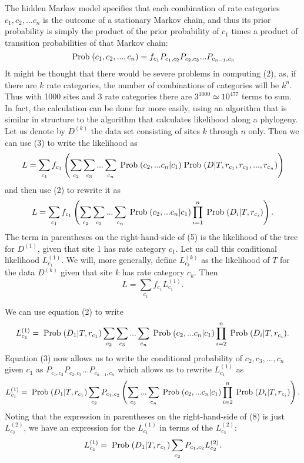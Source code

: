 \documentclass[12pt]{article}
\begin{document}
The hidden Markov model specifies that each combination of rate categories
$c_1, c_2, ... c_n$ is the outcome of a stationary Markov chain, and thus its
prior probability is simply the product of the prior probability of $c_1$
times a product of transition probabilities of that Markov chain:
\begin{equation} %
\prob (c_1, c_2, ..., c_n) = f_{c_1} P_{c_1, c_2} P_{c_2, c_3} ... P_{c_{n-1},c_n}
\end{equation}
It might be thought that there would be severe problems in computing (2), as,
if there are $k$ rate categories, the number of combinations of categories will
be $k^n$.  Thus with 1000 sites and 3 rate categories there are $3^{1000} \simeq
10^{477}$ terms to sum.  In fact, the calculation can be done far more easily,
using an algorithm that is similar in structure to the algorithm that
calculates likelihood along a phylogeny.
Let us denote by $D^{(k)}$ the data set consisting of sites $k$ through $n$ only.
Then we can use (3) to write the likelihood as 
\begin{equation} %
L = \sum_{c_1}f_{c_1}\left(\sum_{c_2} \sum_{c_3} ... \sum_{c_n} \prob(c_2, ... c_n|c_1) \prob(D|T, r_{c_1}, r_{c_2}, ..., r_{c_n})\right)
\end{equation}
and then use (2) to rewrite it as 
\begin{equation} %
L = \sum_{c_1}f_{c_1}\left(\sum_{c_2} \sum_{c_3} ... \sum_{c_n} \prob(c_2, ... c_n|c_1) \prod_{i=1}^n\prob(D_i|T, r_{c_i})\right).
\end{equation}
The term in parentheses on the right-hand-side of (5) is the likelihood
of the tree for $D^{(1)}$, given that site 1 has rate category $c_1$.  Let
us call this conditional likelihood $L_{c_1}^{(1)}$.  We will, more generally,
define $L_{c_k}^{(k)}$ as the likelihood of $T$ for the data $D^{(k)}$ given that
site $k$ has rate category $c_k$.  Then
\begin{equation}%
L = \sum_{c_1} f_{c_1} L_{c_1}^{(1)}.
\end{equation}

We can use equation (2) to write
\begin{equation} %
L_{c_1}^{(1)} = \prob(D_1|T, r_{c_1})\sum_{c_2} \sum_{c_3} ... \sum_{c_n} \prob(c_2, ... c_n|c_1) \prod_{i=2}^n\prob(D_i|T, r_{c_i}).
\end{equation}
Equation (3) now allows us to write
the conditional probability of $c_2, c_3, ..., c_n$ given
$c_1$ as $P_{c_1,c_2}P_{c_2,c_3} ... P_{c_{n-1},c_n}$ which allows us to
rewrite $L_{c_1}^{(1)}$ as
\begin{equation} %
L_{c_1}^{(1)} = \prob(D_1|T, r_{c_1})\sum_{c_2} P_{c_1,c_2} \left(\sum_{c_3} ... \sum_{c_n} \prob(c_2, ... c_n|c_1) \prod_{i=2}^n\prob(D_i|T, r_{c_i})\right).
\end{equation}
Noting that the expression in parentheses on the right-hand-side of (8) is just
$L_{c_2}^{(2)}$, we have an expression for the $L_{c_1}^{(1)}$ in terms of the $L_{c_2}^{(2)}$:
\begin{equation}%
L_{c_1}^{(1)} = \prob(D_1|T, r_{c_1})\sum_{c_2} P_{c_1,c_2} L_{c_2}^{(2)}.
\end{equation}
\end{document}
